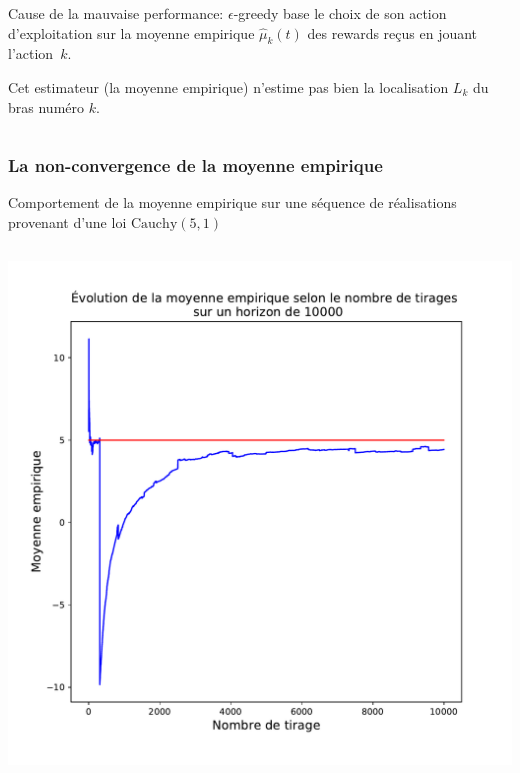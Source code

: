 \documentclass[8pt,sans,aspectratio=169]{beamer}
\begin{document}
\begin{frame}
\begin{columns}[T]
\begin{column}{0.5\linewidth}
\vspace*{1cm}
Cause de la mauvaise performance: $\epsilon$-greedy base le choix de son action d'exploitation sur la moyenne empirique $\hat \mu_k(t)$ des rewards reçus en jouant \mbox{l'action $k.$}

\vspace*{1cm}
\pause
Cet estimateur (la moyenne empirique) n'estime pas bien la localisation $L_k$ du bras numéro $k.$

\vfill
\end{column}
\end{columns}

\end{frame}

\begin{frame}
\frametitle{La non-convergence de la moyenne empirique}

Comportement de la moyenne empirique sur une séquence de réalisations provenant d'une loi $\mathrm{Cauchy}(5,1)$

\pause

\begin{columns}[T] %
\begin{column}{0.5\linewidth}
\includegraphics[scale=0.28]{graphique-moyenne-empirique-1.pdf}
\end{column}%
\hfill%


\end{columns}
\end{frame}
\end{document}
